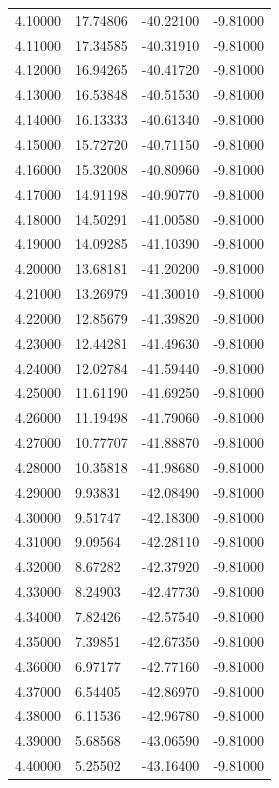 \begin{table}
\begin{tabular}{llll}
4.10000 & 17.74806 & -40.22100 & -9.81000 \\
4.11000 & 17.34585 & -40.31910 & -9.81000 \\
4.12000 & 16.94265 & -40.41720 & -9.81000 \\
4.13000 & 16.53848 & -40.51530 & -9.81000 \\
4.14000 & 16.13333 & -40.61340 & -9.81000 \\
4.15000 & 15.72720 & -40.71150 & -9.81000 \\
4.16000 & 15.32008 & -40.80960 & -9.81000 \\
4.17000 & 14.91198 & -40.90770 & -9.81000 \\
4.18000 & 14.50291 & -41.00580 & -9.81000 \\
4.19000 & 14.09285 & -41.10390 & -9.81000 \\
4.20000 & 13.68181 & -41.20200 & -9.81000 \\
4.21000 & 13.26979 & -41.30010 & -9.81000 \\
4.22000 & 12.85679 & -41.39820 & -9.81000 \\
4.23000 & 12.44281 & -41.49630 & -9.81000 \\
4.24000 & 12.02784 & -41.59440 & -9.81000 \\
4.25000 & 11.61190 & -41.69250 & -9.81000 \\
4.26000 & 11.19498 & -41.79060 & -9.81000 \\
4.27000 & 10.77707 & -41.88870 & -9.81000 \\
4.28000 & 10.35818 & -41.98680 & -9.81000 \\
4.29000 & 9.93831 & -42.08490 & -9.81000 \\
4.30000 & 9.51747 & -42.18300 & -9.81000 \\
4.31000 & 9.09564 & -42.28110 & -9.81000 \\
4.32000 & 8.67282 & -42.37920 & -9.81000 \\
4.33000 & 8.24903 & -42.47730 & -9.81000 \\
4.34000 & 7.82426 & -42.57540 & -9.81000 \\
4.35000 & 7.39851 & -42.67350 & -9.81000 \\
4.36000 & 6.97177 & -42.77160 & -9.81000 \\
4.37000 & 6.54405 & -42.86970 & -9.81000 \\
4.38000 & 6.11536 & -42.96780 & -9.81000 \\
4.39000 & 5.68568 & -43.06590 & -9.81000 \\
4.40000 & 5.25502 & -43.16400 & -9.81000 \\

\end{tabular}
\end{table}
